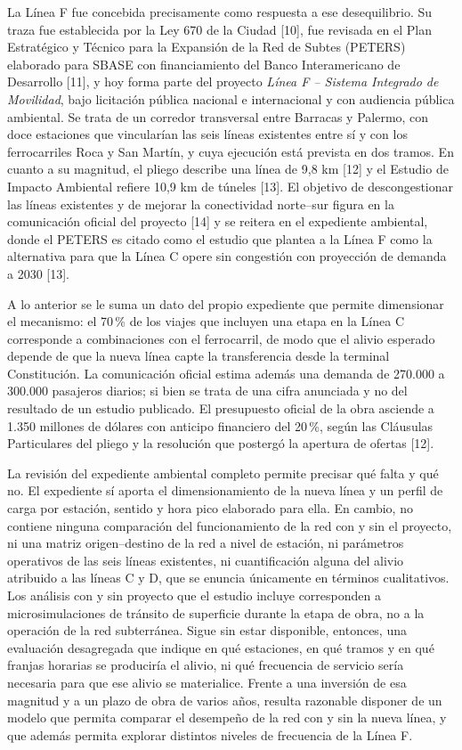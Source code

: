 \documentclass{article}
\begin{document}
La Línea F fue concebida precisamente como respuesta a ese desequilibrio. Su traza fue establecida por la
Ley 670 de la Ciudad [10], fue revisada en el Plan Estratégico y Técnico para la Expansión de la Red de
Subtes (PETERS) elaborado para SBASE con financiamiento del Banco Interamericano de Desarrollo [11], y hoy
forma parte
del proyecto \textit{Línea F -- Sistema Integrado de Movilidad}, bajo licitación pública nacional
e internacional y con audiencia pública ambiental. Se trata de un corredor
transversal entre Barracas y Palermo, con doce estaciones que vincularían las seis líneas existentes entre
sí y con los ferrocarriles Roca y San Martín, y cuya ejecución está prevista en dos tramos. En cuanto a su
magnitud, el pliego describe una línea de 9,8 km [12] y el Estudio
de Impacto Ambiental refiere 10,9 km de túneles [13]. El objetivo de descongestionar las líneas existentes y de mejorar la
conectividad norte--sur figura en la comunicación oficial del proyecto [14] y se reitera en el expediente
ambiental, donde el PETERS es citado como el estudio que plantea a la Línea F como la alternativa para que
la Línea C opere sin congestión con proyección de demanda a 2030 [13].

A lo anterior se le suma un dato del propio expediente que permite dimensionar el
mecanismo: el 70\,\% de los viajes que incluyen una etapa en la Línea C corresponde a combinaciones con el
ferrocarril, de modo que el alivio esperado depende de que la nueva línea capte la transferencia desde la
terminal Constitución. La comunicación oficial estima además una demanda de 270.000 a 300.000 pasajeros
diarios; si bien se trata de una cifra anunciada y no del resultado de un estudio publicado. El
presupuesto oficial de la obra asciende a 1.350 millones de dólares con anticipo financiero del 20\,\%, según
las Cláusulas Particulares del pliego y la resolución que postergó la apertura de ofertas [12].

La revisión del expediente ambiental completo
permite precisar qué falta y qué no. El expediente sí aporta el dimensionamiento de la nueva línea y un
perfil de carga por estación, sentido y hora pico elaborado para ella. En cambio, no contiene ninguna
comparación del funcionamiento de la red con y sin el proyecto, ni una matriz origen--destino de la red a
nivel de estación, ni parámetros operativos de las seis líneas existentes, ni cuantificación alguna del
alivio atribuido a las líneas C y D, que se enuncia únicamente en términos cualitativos. Los análisis con y
sin proyecto que el estudio incluye corresponden a microsimulaciones de tránsito de superficie durante la
etapa de obra, no a la operación de la red subterránea. Sigue sin estar disponible, entonces, una evaluación
desagregada que indique en qué estaciones, en qué tramos y en qué franjas horarias se produciría el alivio,
ni qué frecuencia de servicio sería necesaria para que ese alivio se materialice. Frente a una inversión de
esa magnitud y a un plazo de obra de varios años, resulta razonable disponer de un modelo que permita
comparar el desempeño de la red con y sin la nueva línea, y que además permita explorar distintos niveles de
frecuencia de la Línea F.
\end{document}
